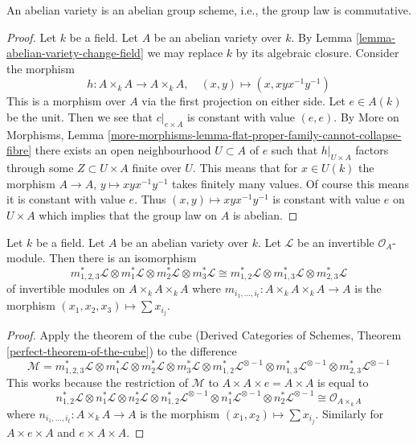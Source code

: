 \begin{lemma}
\label{lemma-abelian-variety-abelian}
An abelian variety is an abelian group scheme, i.e., the group
law is commutative.
\end{lemma}

\begin{proof}
Let $k$ be a field. Let $A$ be an abelian variety over $k$.
By Lemma \ref{lemma-abelian-variety-change-field} we may replace
$k$ by its algebraic closure. Consider the morphism
$$
h : A \times_k A \longrightarrow A \times_k A,\quad
(x, y) \longmapsto (x, xyx^{-1}y^{-1})
$$
This is a morphism over $A$ via the first projection on either side.
Let $e \in A(k)$ be the unit. Then we see that $c|_{e \times A}$ is
constant with value $(e, e)$. By More on Morphisms, Lemma
\ref{more-morphisms-lemma-flat-proper-family-cannot-collapse-fibre}
there exists an open neighbourhood $U \subset A$ of $e$
such that $h|_{U \times A}$ factors through some $Z \subset U \times A$
finite over $U$. This means that for $x \in U(k)$ the morphism
$A \to A$, $y \mapsto xyx^{-1}y^{-1}$ takes finitely many values.
Of course this means it is constant with value $e$. Thus
$(x, y) \mapsto xyx^{-1}y^{-1}$ is
constant with value $e$ on $U \times A$ which implies
that the group law on $A$ is abelian.
\end{proof}

\begin{lemma}
\label{lemma-apply-cube}
Let $k$ be a field. Let $A$ be an abelian variety over $k$.
Let $\mathcal{L}$ be an invertible $\mathcal{O}_A$-module.
Then there is an isomorphism
$$
m_{1, 2, 3}^*\mathcal{L} \otimes
m_1^*\mathcal{L} \otimes
m_2^*\mathcal{L} \otimes
m_3^*\mathcal{L} \cong
m_{1, 2}^*\mathcal{L} \otimes
m_{1, 3}^*\mathcal{L} \otimes
m_{2, 3}^*\mathcal{L}
$$
of invertible modules on $A \times_k A \times_k A$
where $m_{i_1, \ldots, i_t} : A \times_k A \times_k A \to A$
is the morphism $(x_1, x_2, x_3) \mapsto \sum x_{i_j}$.
\end{lemma}

\begin{proof}
Apply the theorem of the cube
(Derived Categories of Schemes, Theorem \ref{perfect-theorem-of-the-cube})
to the difference
$$
\mathcal{M} =
m_{1, 2, 3}^*\mathcal{L} \otimes
m_1^*\mathcal{L} \otimes
m_2^*\mathcal{L} \otimes
m_3^*\mathcal{L} \otimes
m_{1, 2}^*\mathcal{L}^{\otimes -1} \otimes
m_{1, 3}^*\mathcal{L}^{\otimes -1} \otimes
m_{2, 3}^*\mathcal{L}^{\otimes -1}
$$
This works because the restriction of $\mathcal{M}$
to $A \times A \times e = A \times A$ is equal to
$$
n_{1, 2}^*\mathcal{L} \otimes
n_1^*\mathcal{L} \otimes
n_2^*\mathcal{L} \otimes
n_{1, 2}^*\mathcal{L}^{\otimes -1} \otimes
n_1^*\mathcal{L}^{\otimes -1} \otimes
n_2^*\mathcal{L}^{\otimes -1} \cong \mathcal{O}_{A \times_k A}
$$
where $n_{i_1, \ldots, i_t} : A \times_k A \to A$
is the morphism $(x_1, x_2) \mapsto \sum x_{i_j}$.
Similarly for $A \times e \times A$ and $e \times A \times A$.
\end{proof}

